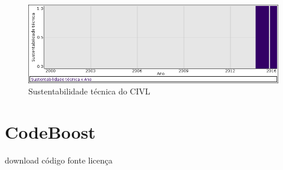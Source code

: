 \begin{figure}[h]
  \center
  \includegraphics[scale=0.50]{imagens/softwares-charts/civl.png}
  \caption{Sustentabilidade técnica do CIVL}
\end{figure}


\section{CodeBoost}
\checkmark download
\checkmark código fonte
\checkmark licença


